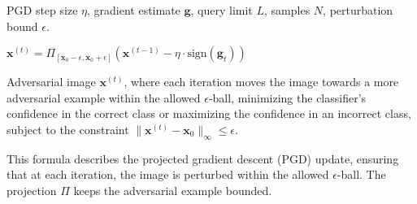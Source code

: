 PGD step size $\eta$, gradient estimate $\mathbf{g}$, query limit $L$, samples $N$, perturbation bound $\epsilon$.

$\mathbf{x}^{(t)} = \Pi_{[\mathbf{x}_0 - \epsilon, \mathbf{x}_0 + \epsilon]}\left(\mathbf{x}^{(t-1)} - \eta \cdot \text{sign}(\mathbf{g}_t)\right)$

Adversarial image $\mathbf{x}^{(t)}$, where each iteration moves the image towards a more adversarial example within the allowed $\epsilon$-ball, minimizing the classifier's confidence in the correct class or maximizing the confidence in an incorrect class, subject to the constraint $\|\mathbf{x}^{(t)} - \mathbf{x}_0\|_\infty \leq \epsilon$.

This formula describes the projected gradient descent (PGD) update, ensuring that at each iteration, the image is perturbed within the allowed $\epsilon$-ball. The projection $\Pi$ keeps the adversarial example bounded.
